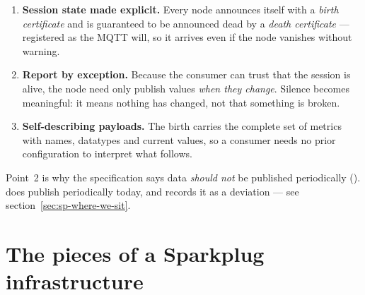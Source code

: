\begin{enumerate}
  \item \textbf{Session state made explicit.} Every node announces itself with a
        \emph{birth certificate} and is guaranteed to be announced dead by a \emph{death
        certificate} --- registered as the MQTT will, so it arrives even if the node
        vanishes without warning.
  \item \textbf{Report by exception.} Because the consumer can trust that the session is
        alive, the node need only publish values \emph{when they change}. Silence becomes
        meaningful: it means nothing has changed, not that something is broken.
  \item \textbf{Self-describing payloads.} The birth carries the complete set of metrics
        with names, datatypes and current values, so a consumer needs no prior
        configuration to interpret what follows.
\end{enumerate}

\begin{note}
Point~2 is why the specification says data \emph{should not} be published periodically
(). \prog does publish periodically today, and
records it as a deviation --- see section~\ref{sec:sp-where-we-sit}.
\end{note}

\section{The pieces of a Sparkplug infrastructure}

